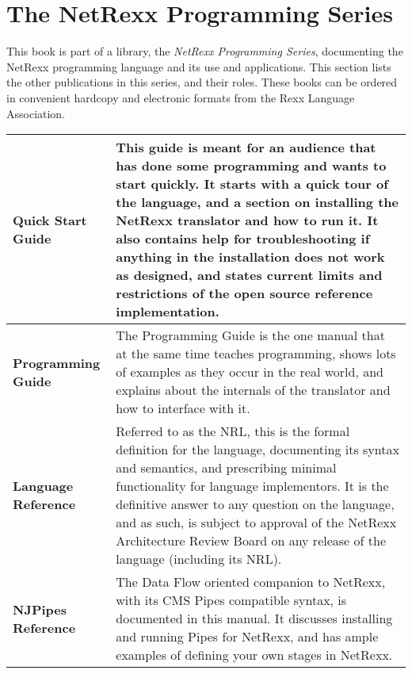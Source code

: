 \chapter{The NetRexx Programming Series}
This book is part of a library, the \emph{NetRexx Programming Series}, documenting the NetRexx programming language and its use and applications. This section lists the other publications in this series, and their roles. These books can be ordered in convenient hardcopy and electronic formats from the Rexx Language Association.
\newline
\newline
\newline
\begin{tabularx}{\textwidth}{>{\bfseries}lX}
\toprule
Quick Start Guide & This guide is meant for an audience that has done some programming and wants to start quickly. It starts with a quick tour of the language, and a section on installing the NetRexx translator and how to run it. It also contains help for troubleshooting if anything in the installation does not work as designed, and states current limits and restrictions of the open source reference implementation.
\\\midrule
Programming Guide & The Programming Guide is the one manual that at the same time teaches programming, shows lots of examples as they occur in the real world, and explains about the internals of the translator and how to interface with it.
\\\midrule
Language Reference & Referred to as the NRL, this is the formal definition for the language, documenting its syntax and semantics, and prescribing minimal functionality for language implementors. It is the definitive answer to any question on the language, and as such, is subject to approval of the NetRexx Architecture Review Board on any release of the language (including its NRL).
\\\midrule
NJPipes Reference & The Data Flow oriented companion to NetRexx, with its CMS Pipes compatible syntax, is documented in this manual. It discusses installing and running Pipes for NetRexx, and has ample examples of defining your own stages in NetRexx.
\\\bottomrule
\end{tabularx}
